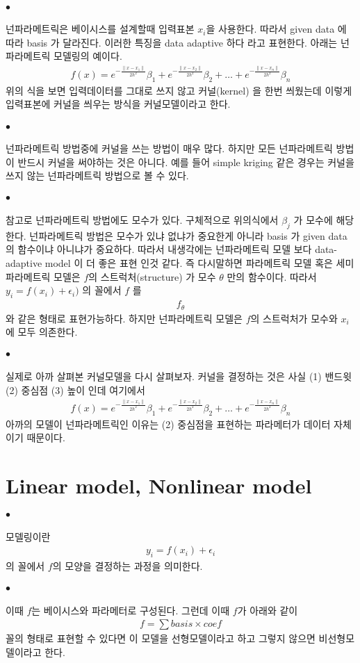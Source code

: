 \documentclass[12pt,oneside,english,a4paper]{article}
\def\ck{\paragraph{\Large$\bullet$}\Large}
\begin{document}
\ck 넌파라메트릭은 베이시스를 설계할때 입력표본 $x_i$을 사용한다. 따라서 given data 에 따라 basis 가 달라진다. 이러한 특징을 data adaptive 하다 라고 표현한다. 아래는 넌파라메트릭 모델링의 예이다. 
\begin{align*}
f(x)=e^{-\frac{\| x-x_1\|}{2h^2}}\beta_1+e^{-\frac{\| x-x_2\|}{2h^2}} \beta_2+\dots+e^{-\frac{\| x-x_n\|}{2h^2} }\beta_n
\end{align*}
위의 식을 보면 입력데이터를 그대로 쓰지 않고 커널(kernel) 을 한번 씌웠는데 이렇게 입력표본에 커널을 씌우는 방식을 커널모델이라고 한다. 

\ck 넌파라메트릭 방법중에 커널을 쓰는 방법이 매우 많다. 하지만 모든 넌파라메트릭 방법이 반드시 커널을 써야하는 것은 아니다. 예를 들어 simple kriging 같은 경우는 커널을 쓰지 않는 넌파라메트릭 방법으로 볼 수 있다. 

\ck 참고로 넌파라메트릭 방법에도 모수가 있다. 구체적으로 위의식에서 $\beta_j$ 가 모수에 해당한다. 넌파라메트릭 방법은 모수가 있냐 없냐가 중요한게 아니라 basis 가 given data 의 함수이냐 아니냐가 중요하다. 따라서 내생각에는 넌파라메트릭 모델 보다 data-adaptive model 이 더 좋은 표현 인것 같다. 즉 다시말하면 파라메트릭 모델 혹은 세미파라메트릭 모델은 $f$의 스트럭처(structure) 가 모수 $\theta$ 만의 함수이다. 따라서 $y_i=f(x_i)+\epsilon_i)$ 의 꼴에서 $f$ 를 
\begin{align*}
f_{\theta}
\end{align*}
와 같은 형태로 표현가능하다. 하지만 넌파라메트릭 모델은 $f$의 스트럭처가 모수와 $x_i$에 모두 의존한다. 

\ck 실제로 아까 살펴본 커널모델을 다시 살펴보자. 커널을 결정하는 것은 사실 (1) 밴드윗 (2) 중심점 (3) 높이 인데 여기에서 
\begin{align*}
f(x)=e^{-\frac{\| x-x_1\|}{2h^2}}\beta_1+e^{-\frac{\| x-x_2\|}{2h^2}} \beta_2+\dots+e^{-\frac{\| x-x_n\|}{2h^2} }\beta_n
\end{align*}
아까의 모델이 넌파라메트릭인 이유는 (2) 중심점을 표현하는 파라메터가 데이터 자체이기 때문이다. 

\section{Linear model, Nonlinear model}

\ck 모델링이란 
\begin{align*}
y_i=f(x_i)+\epsilon_i
\end{align*}
의 꼴에서 $f$의 모양을 결정하는 과정을 의미한다. 

\ck 이때 $f$는 베이시스와 파라메터로 구성된다. 그런데 이때 $f$가 아래와 같이 
\begin{align*}
f = \sum basis \times coef
\end{align*}
꼴의 형태로 표현할 수 있다면 이 모델을 선형모델이라고 하고 그렇지 않으면 비선형모델이라고 한다. 
\end{document}
